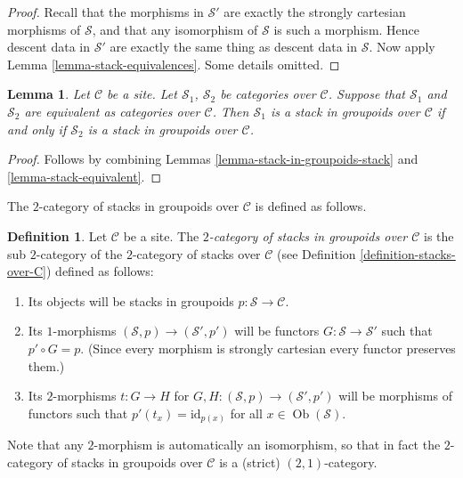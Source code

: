 \documentclass{stacks-project}
\theoremstyle{plain}
\newtheorem{lemma}[subsection]{Lemma}
\theoremstyle{definition}
\newtheorem{definition}[subsection]{Definition}
\theoremstyle{remark}
\numberwithin{equation}{subsection}
\def\Ob{\mathop{\mathrm{Ob}}\nolimits}
\begin{document}
\begin{proof}
Recall that the morphisms in $\mathcal{S}'$ are exactly the
strongly cartesian morphisms of $\mathcal{S}$, and that any isomorphism of
$\mathcal{S}$ is such a morphism. Hence descent data in $\mathcal{S}'$
are exactly the same thing as descent data in $\mathcal{S}$. Now apply
Lemma \ref{lemma-stack-equivalences}. Some details omitted.
\end{proof}

\begin{lemma}
\label{lemma-stack-in-groupoids-equivalent}
Let $\mathcal{C}$ be a site.
Let $\mathcal{S}_1$, $\mathcal{S}_2$ be categories over $\mathcal{C}$.
Suppose that $\mathcal{S}_1$ and $\mathcal{S}_2$ are equivalent
as categories over $\mathcal{C}$.
Then $\mathcal{S}_1$ is a stack in groupoids over $\mathcal{C}$ if and only if
$\mathcal{S}_2$ is a stack in groupoids over $\mathcal{C}$.
\end{lemma}

\begin{proof}
Follows by combining
Lemmas \ref{lemma-stack-in-groupoids-stack} and \ref{lemma-stack-equivalent}.
\end{proof}

\noindent
The $2$-category of stacks in groupoids over $\mathcal{C}$
is defined as follows.

\begin{definition}
\label{definition-stacks-in-groupoids-over-C}
Let $\mathcal{C}$ be a site.
The {\it $2$-category of stacks in groupoids over $\mathcal{C}$}
is the sub $2$-category of the $2$-category of stacks
over $\mathcal{C}$ (see Definition \ref{definition-stacks-over-C})
defined as follows:
\begin{enumerate}
\item Its objects will be stacks in groupoids
$p : \mathcal{S} \to \mathcal{C}$.
\item Its $1$-morphisms $(\mathcal{S}, p) \to (\mathcal{S}', p')$
will be functors $G : \mathcal{S} \to \mathcal{S}'$ such that
$p' \circ G = p$. (Since every morphism is strongly cartesian
every functor preserves them.)
\item Its $2$-morphisms $t : G \to H$ for
$G, H : (\mathcal{S}, p) \to (\mathcal{S}', p')$
will be morphisms of functors
such that $p'(t_x) = \text{id}_{p(x)}$
for all $x \in \Ob(\mathcal{S})$.
\end{enumerate}
\end{definition}

\noindent
Note that any $2$-morphism is automatically an isomorphism, so
that in fact the $2$-category of stacks in groupoids over $\mathcal{C}$
is a (strict) $(2, 1)$-category.
\end{document}
